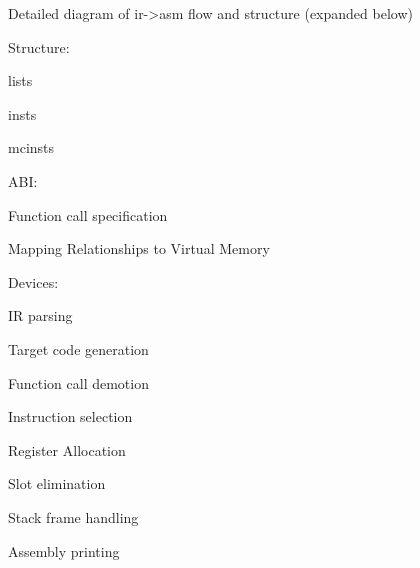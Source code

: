 Detailed diagram of ir->asm flow and structure (expanded below)

Structure:

    lists

    insts

    mcinsts

ABI:

    Function call specification

    Mapping Relationships to Virtual Memory

Devices:

    IR parsing

    Target code generation

        Function call demotion

        Instruction selection

        Register Allocation

        Slot elimination

        Stack frame handling

        Assembly printing